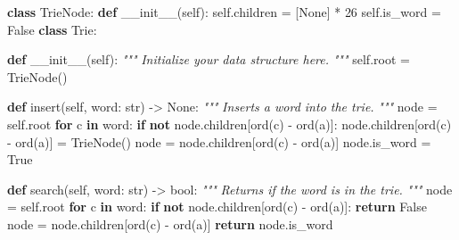 \documentclass[
]{article}
\newenvironment{Shaded}{}{}
\newcommand{\BuiltInTok}[1]{#1}
\newcommand{\CommentTok}[1]{\textcolor[rgb]{0.38,0.63,0.69}{\textit{#1}}}
\newcommand{\ControlFlowTok}[1]{\textcolor[rgb]{0.00,0.44,0.13}{\textbf{#1}}}
\newcommand{\DecValTok}[1]{\textcolor[rgb]{0.25,0.63,0.44}{#1}}
\newcommand{\FunctionTok}[1]{\textcolor[rgb]{0.02,0.16,0.49}{#1}}
\newcommand{\KeywordTok}[1]{\textcolor[rgb]{0.00,0.44,0.13}{\textbf{#1}}}
\newcommand{\NormalTok}[1]{#1}
\newcommand{\OperatorTok}[1]{\textcolor[rgb]{0.40,0.40,0.40}{#1}}
\newcommand{\StringTok}[1]{\textcolor[rgb]{0.25,0.44,0.63}{#1}}
\newcommand{\VariableTok}[1]{\textcolor[rgb]{0.10,0.09,0.49}{#1}}
\begin{document}
\begin{Shaded}
\begin{Highlighting}[]
\KeywordTok{class}\NormalTok{ TrieNode:}
    \KeywordTok{def} \FunctionTok{\_\_init\_\_}\NormalTok{(}\VariableTok{self}\NormalTok{):}
        \VariableTok{self}\NormalTok{.children }\OperatorTok{=}\NormalTok{ [}\VariableTok{None}\NormalTok{] }\OperatorTok{*} \DecValTok{26}
        \VariableTok{self}\NormalTok{.is\_word }\OperatorTok{=} \VariableTok{False}
\KeywordTok{class}\NormalTok{ Trie:}

    \KeywordTok{def} \FunctionTok{\_\_init\_\_}\NormalTok{(}\VariableTok{self}\NormalTok{):}
        \CommentTok{"""}
\CommentTok{        Initialize your data structure here.}
\CommentTok{        """}
        \VariableTok{self}\NormalTok{.root }\OperatorTok{=}\NormalTok{ TrieNode()}

    \KeywordTok{def}\NormalTok{ insert(}\VariableTok{self}\NormalTok{, word: }\BuiltInTok{str}\NormalTok{) }\OperatorTok{{-}\textgreater{}} \VariableTok{None}\NormalTok{:}
        \CommentTok{"""}
\CommentTok{        Inserts a word into the trie.}
\CommentTok{        """}
\NormalTok{        node }\OperatorTok{=} \VariableTok{self}\NormalTok{.root}
        \ControlFlowTok{for}\NormalTok{ c }\KeywordTok{in}\NormalTok{ word:}
            \ControlFlowTok{if} \KeywordTok{not}\NormalTok{ node.children[}\BuiltInTok{ord}\NormalTok{(c) }\OperatorTok{{-}} \BuiltInTok{ord}\NormalTok{(}\StringTok{\textquotesingle{}a\textquotesingle{}}\NormalTok{)]:}
\NormalTok{                node.children[}\BuiltInTok{ord}\NormalTok{(c) }\OperatorTok{{-}} \BuiltInTok{ord}\NormalTok{(}\StringTok{\textquotesingle{}a\textquotesingle{}}\NormalTok{)] }\OperatorTok{=}\NormalTok{ TrieNode()}
\NormalTok{            node }\OperatorTok{=}\NormalTok{ node.children[}\BuiltInTok{ord}\NormalTok{(c) }\OperatorTok{{-}} \BuiltInTok{ord}\NormalTok{(}\StringTok{\textquotesingle{}a\textquotesingle{}}\NormalTok{)]}
\NormalTok{        node.is\_word }\OperatorTok{=} \VariableTok{True}

    \KeywordTok{def}\NormalTok{ search(}\VariableTok{self}\NormalTok{, word: }\BuiltInTok{str}\NormalTok{) }\OperatorTok{{-}\textgreater{}} \BuiltInTok{bool}\NormalTok{:}
        \CommentTok{"""}
\CommentTok{        Returns if the word is in the trie.}
\CommentTok{        """}
\NormalTok{        node }\OperatorTok{=} \VariableTok{self}\NormalTok{.root}
        \ControlFlowTok{for}\NormalTok{ c }\KeywordTok{in}\NormalTok{ word:}
            \ControlFlowTok{if} \KeywordTok{not}\NormalTok{ node.children[}\BuiltInTok{ord}\NormalTok{(c) }\OperatorTok{{-}} \BuiltInTok{ord}\NormalTok{(}\StringTok{\textquotesingle{}a\textquotesingle{}}\NormalTok{)]:}
                \ControlFlowTok{return} \VariableTok{False}
\NormalTok{            node }\OperatorTok{=}\NormalTok{ node.children[}\BuiltInTok{ord}\NormalTok{(c) }\OperatorTok{{-}} \BuiltInTok{ord}\NormalTok{(}\StringTok{\textquotesingle{}a\textquotesingle{}}\NormalTok{)]}
        \ControlFlowTok{return}\NormalTok{ node.is\_word}


\end{Highlighting}
\end{Shaded}
\end{document}
